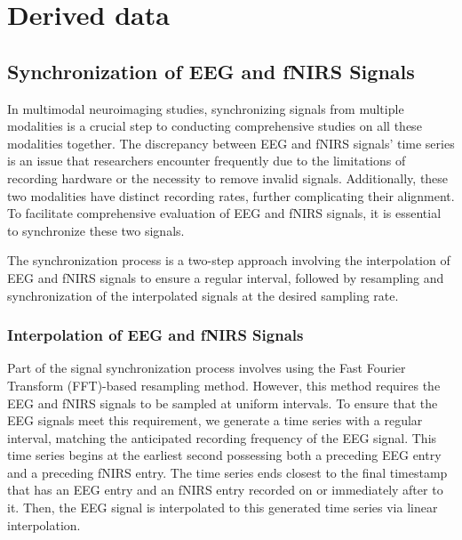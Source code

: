 \section{Derived data}



\subsection{Synchronization of EEG and fNIRS Signals}


In multimodal neuroimaging studies, synchronizing signals from multiple modalities is a crucial step to conducting comprehensive studies on all these modalities together. The discrepancy between EEG and fNIRS signals' time series is an issue that researchers encounter frequently due to the limitations of recording hardware or the necessity to remove invalid signals. Additionally, these two modalities have distinct recording rates, further complicating their alignment. To facilitate comprehensive evaluation of EEG and fNIRS signals, it is essential to synchronize these two signals.

The synchronization process is a two-step approach involving the interpolation of EEG and fNIRS signals to ensure a regular interval, followed by resampling and synchronization of the interpolated signals at the desired sampling rate.

\subsubsection{Interpolation of EEG and fNIRS Signals}


Part of the signal synchronization process involves using the Fast Fourier Transform (FFT)-based resampling method. However, this method requires the EEG and fNIRS signals to be sampled at uniform intervals. To ensure that the EEG signals meet this requirement, we generate a time series with a regular interval, matching the anticipated recording frequency of the EEG signal. This time series begins at the earliest second possessing both a preceding EEG entry and a preceding fNIRS entry. The time series ends closest to the final timestamp that has an EEG entry and an fNIRS entry recorded on or immediately after to it. Then, the EEG signal is interpolated to this generated time series via linear interpolation.

